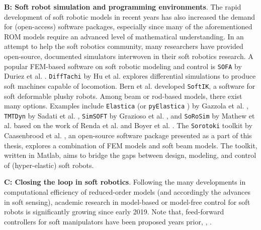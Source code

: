 \textbf{B: Soft robot simulation and programming environments}.
The rapid development of soft robotic models in recent years has also increased the demand for (open-access) software packages, especially since many of the aforementioned ROM models require an advanced level of mathematical understanding. In an attempt to help the soft robotics community, many researchers have provided open-source, documented simulators interwoven in their soft robotics research. A popular FEM-based software on soft robotic modeling and control is \texttt{SOFA} by Duriez et al. \cite{Duriez2013,Coevoet2017}. \texttt{DiffTachi} by Hu et al. \cite{Hu2019taichi, Hu2019Oct} explores differential simulations to produce soft machines capable of locomotion. Bern et al. \cite{Bern2022,Bern2019} developed \texttt{SoftIK}, a software for soft deformable plushy robots. Among beam or rod-based models, there exist many options. Examples include \texttt{Elastica} (or \texttt{pyElastica} \cite{Tekinalp2022}) by Gazzola et al. \cite{Gazzola2018,Zhang2019}, \texttt{TMTDyn} by Sadati et al. \cite{Sadati2020}, \texttt{SimSOFT} by Grazioso et al. \cite{Grazioso2019}, and \texttt{SoRoSim} by Mathew et al. \cite{Mathew2021Jul} based on the work of Renda et al. \cite{Renda2020} and Boyer et al. \cite{Boyer2021}. The \texttt{Sorotoki} toolkit by Caasenbrood et al. \cite{SorotokiCode}, an open-source software package presented as a part of this thesis, explores a combination of FEM models and soft beam models. The toolkit, written in Matlab, aims to bridge the gaps between design, modeling, and control of (hyper-elastic) soft robots.

\textbf{C: Closing the loop in soft robotics}. Following the many developments in computational efficiency of reduced-order models (and accordingly the advances in soft sensing), academic research in model-based or model-free control for soft robots is significantly growing since early 2019. Note that, feed-forward controllers for soft manipulators have been proposed years prior, \eg, \cite{Falkenhahn2015May,Falkenhahn2015,Thuruthel2017Oct,Satheeshbabu2019May}.


